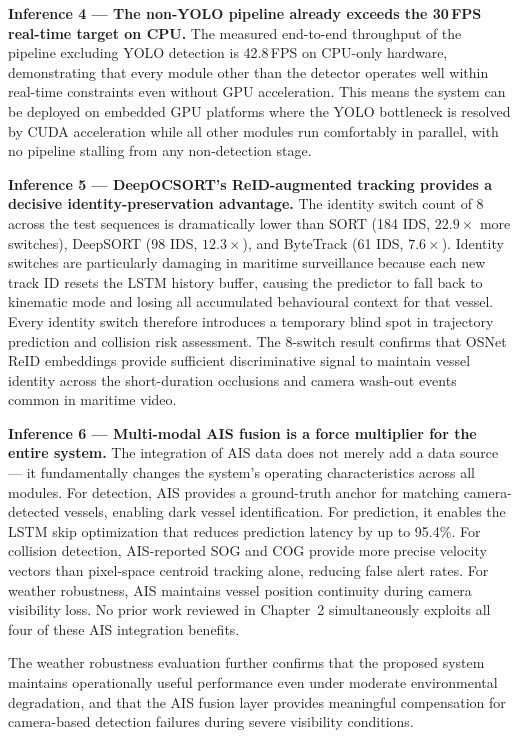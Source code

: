\textbf{Inference 4 — The non-YOLO pipeline already exceeds the 30\,FPS real-time target on CPU.}
The measured end-to-end throughput of the pipeline excluding YOLO detection is 42.8\,FPS on CPU-only hardware, demonstrating that every module other than the detector operates well within real-time constraints even without GPU acceleration. This means the system can be deployed on embedded GPU platforms where the YOLO bottleneck is resolved by CUDA acceleration while all other modules run comfortably in parallel, with no pipeline stalling from any non-detection stage.

\textbf{Inference 5 — DeepOCSORT's ReID-augmented tracking provides a decisive identity-preservation advantage.}
The identity switch count of 8 across the test sequences is dramatically lower than SORT (184 IDS, $22.9\times$ more switches), DeepSORT (98 IDS, $12.3\times$), and ByteTrack (61 IDS, $7.6\times$). Identity switches are particularly damaging in maritime surveillance because each new track ID resets the LSTM history buffer, causing the predictor to fall back to kinematic mode and losing all accumulated behavioural context for that vessel. Every identity switch therefore introduces a temporary blind spot in trajectory prediction and collision risk assessment. The 8-switch result confirms that OSNet ReID embeddings provide sufficient discriminative signal to maintain vessel identity across the short-duration occlusions and camera wash-out events common in maritime video.

\textbf{Inference 6 — Multi-modal AIS fusion is a force multiplier for the entire system.}
The integration of AIS data does not merely add a data source — it fundamentally changes the system's operating characteristics across all modules. For detection, AIS provides a ground-truth anchor for matching camera-detected vessels, enabling dark vessel identification. For prediction, it enables the LSTM skip optimization that reduces prediction latency by up to 95.4\%. For collision detection, AIS-reported SOG and COG provide more precise velocity vectors than pixel-space centroid tracking alone, reducing false alert rates. For weather robustness, AIS maintains vessel position continuity during camera visibility loss. No prior work reviewed in Chapter~2 simultaneously exploits all four of these AIS integration benefits.

The weather robustness evaluation further confirms that the proposed system maintains operationally useful performance even under moderate environmental degradation, and that the AIS fusion layer provides meaningful compensation for camera-based detection failures during severe visibility conditions.

